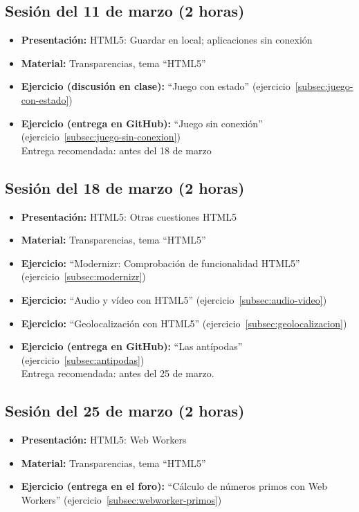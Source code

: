 \documentclass[a4paper,12pt]{report}
\begin{document}
\subsection{Sesión del 11 de marzo (2 horas)}

\begin{itemize}
 \item \textbf{Presentación:} HTML5: Guardar en local; aplicaciones sin conexión
 \item \textbf{Material:} Transparencias, tema ``HTML5''
 \item \textbf{Ejercicio (discusión en clase):} ``Juego con estado'' (ejercicio~\ref{subsec:juego-con-estado})
 \item \textbf{Ejercicio (entrega en GitHub):} ``Juego sin conexión'' (ejercicio~\ref{subsec:juego-sin-conexion}) \\
 Entrega recomendada: antes del 18 de marzo
\end{itemize}

\subsection{Sesión del 18 de marzo (2 horas)}

\begin{itemize}
 \item \textbf{Presentación:} HTML5: Otras cuestiones HTML5
 \item \textbf{Material:} Transparencias, tema ``HTML5''
 \item \textbf{Ejercicio:} ``Modernizr: Comprobación de funcionalidad HTML5'' (ejercicio~\ref{subsec:modernizr})
 \item \textbf{Ejercicio:} ``Audio y vídeo con HTML5'' (ejercicio~\ref{subsec:audio-video})
 \item \textbf{Ejercicio:} ``Geolocalización con HTML5'' (ejercicio~\ref{subsec:geolocalizacion})
 \item \textbf{Ejercicio (entrega en GitHub):} ``Las antípodas'' (ejercicio~\ref{subsec:antipodas})
\\
Entrega recomendada: antes del 25 de marzo.
\end{itemize}


\subsection{Sesión del 25 de marzo (2 horas)}

\begin{itemize}
 \item \textbf{Presentación:} HTML5: Web Workers
 \item \textbf{Material:} Transparencias, tema ``HTML5''
 \item \textbf{Ejercicio (entrega en el foro):} ``Cálculo de números primos con Web Workers'' (ejercicio~\ref{subsec:webworker-primos})
\end{itemize}
\end{document}
